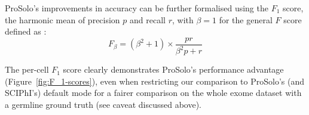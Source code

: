 \documentclass[authoryear,preprint,11pt]{scrartcl}
\begin{document}
ProSolo's improvements in accuracy can be further formalised using the $F_1$ score, the harmonic mean of precision $p$ and recall $r$, with $\beta = 1$ for the general $F$ score defined as \citep{van_rijsbergen_evaluation_1979,chinchor_muc-4_1992}:\\

\begin{equation} \label{eq:F_1_score}
  F_{\beta} = (\beta^2 + 1) \times \frac{p r}{\beta^2 p + r}
\end{equation}

The per-cell $F_1$ score clearly demonstrates ProSolo's performance advantage (Figure~\ref{fig:F_1-scores}), even when restricting our comparison to ProSolo's (and SCIPhI's) default mode for a fairer comparison on the whole exome dataset with a germline ground truth (see caveat discussed above).
\end{document}
